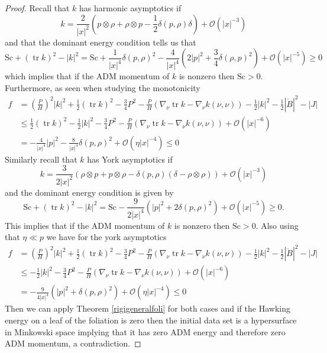 \documentclass[12pt,a4paper]{amsart}
\theoremstyle{plain}
\theoremstyle{definition}
\newcommand{\tr}{\operatorname{tr}}
\begin{document}
\begin{proof}
Recall that $k$ has harmonic asymptotics if 
\[
k = \frac{2}{|x|^2} (p \otimes \rho + \rho \otimes p -\frac{1}{2} \delta( p, \rho ) \delta) + \mathcal{O} ( |x|^{-3}) 
\]
and that the   dominant energy condition tells us that  
$$\mathrm{Sc} + (\tr k)^2 - |k|^2= \mathrm{Sc} +\frac{1}{|x|^4}\delta( p,\rho )^2 - \frac{4}{|x|^4} (2|p|^2 + \frac{3}{4} \delta( \rho, p )^2 ) + \mathcal{O} ( |x|^{-5}) \geq 0 $$
which implies that if the ADM momentum of $k$ is nonzero then $\mathrm{Sc} >0$. Furthermore,  as seen when studying the monotonicity 
\begin{equation}
\begin{split}
        f&=\left( \frac{P}{H}\right)^2|k|^2+ \frac{1}{2 }(\tr k)^2    - \frac{3}{4} P^2- \frac{P}{H}( \nabla_\nu \tr k - \nabla_\nu k(\nu,\nu )) -  \frac{1}{2} |k|^2  -\frac{1}{2} |\mathring{B}|^2 -|J|\\
        &\leq  \frac{1}{2 }(\tr k)^2 -  \frac{1}{2} |k|^2    - \frac{3}{4} P^2- \frac{P}{H}( \nabla_\nu \tr k - \nabla_\nu k(\nu,\nu )) +\mathcal{O} ( |x|^{-6})\\  
        &=   -\frac{4}{|x|^4}|p|^2 -\frac{8}{|x|^4}  \delta( p, \rho )^2 +\mathcal{O} (\eta |x|^{-4}) \leq 0    
\end{split}
\end{equation}
Similarly recall that $k$ has York asymptotics if 
$$k = \frac{3}{2|x|^2} \left( \rho \otimes p + p \otimes \rho - \delta( p, \rho ) (\delta - \rho \otimes \rho) \right) +\mathcal{O}(|x|^{-3}) $$
and  the dominant energy condition  is given by 
$$\mathrm{Sc} + (\tr k)^2 - |k|^2= \mathrm{Sc}- \frac{9}{2 |x|^4} (|p|^2 +2 \delta( p, \rho )^2) + \mathcal{O} (|x|^{-5}) \geq  0. $$
This implies that if the ADM momentum of $k$ is nonzero then $\mathrm{Sc} >0$.
Also using that $\eta \ll p$ we have for the york asymptotics 
\begin{equation}
\begin{split}
        f&=\left( \frac{P}{H}\right)^2|k|^2+ \frac{1}{2 }(\tr k)^2    - \frac{3}{4} P^2- \frac{P}{H}( \nabla_\nu \tr k - \nabla_\nu k(\nu,\nu )) -  \frac{1}{2} |k|^2  -\frac{1}{2} |\mathring{B}|^2 -|J|\\
        &\leq   -  \frac{1}{2} |k|^2    - \frac{3}{4} P^2- \frac{P}{H}( \nabla_\nu \tr k - \nabla_\nu k(\nu,\nu )) +\mathcal{O} ( |x|^{-6})\\  
        &=   -\frac{9}{4|x|^4}(|p|^2 + \delta( p, \rho )^2 ) +\mathcal{O} (\eta |x|^{-4}) \leq 0    
\end{split}
\end{equation}
Then we can apply  Theorem \ref{rigigeneralfoli} for both cases and if the Hawking energy on a leaf of the foliation is zero then the initial data set is a hypersurface in Minkowski space implying that it has zero ADM energy and therefore zero ADM momentum, a contradiction.
\end{proof}
\end{document}
